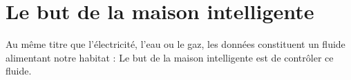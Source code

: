 \documentclass[12pt,twoside,a4paper]{article}
\begin{document}
\section{ Le but de la maison intelligente }

Au même titre que l'électricité, l'eau ou le gaz, les données constituent un fluide alimentant notre habitat : Le but de la maison intelligente est de contrôler ce fluide.
\end{document}
